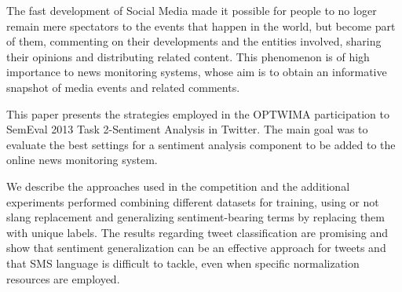 The fast development of Social Media made it possible for people to no loger remain mere spectators to the events that happen in the world, 
  but become part of them, commenting on their developments and the entities
 involved, 
  sharing their opinions and distributing related content. 
  This phenomenon is of high importance to news monitoring systems, whose aim is
 to obtain an informative snapshot of media events and related comments.
 
  This paper presents the strategies employed in the OPTWIMA participation to
 SemEval 2013 Task 2-Sentiment
 Analysis in Twitter. The main goal was to evaluate the best settings for a
 sentiment analysis component
 to be added to the online news monitoring system. 
 
 We describe the approaches used in the competition and the
 additional experiments performed combining different datasets for training,
 using or not slang replacement and generalizing sentiment-bearing terms by
 replacing them with unique labels. The results regarding tweet classification
 are promising and show that sentiment generalization can be an effective
 approach for tweets and that SMS language is difficult to tackle, even when
 specific normalization resources are employed.

